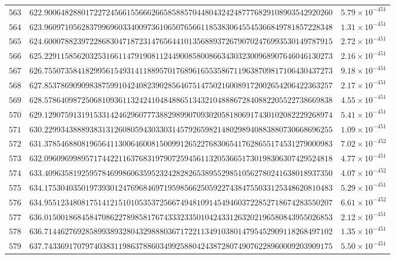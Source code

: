 \documentclass[12pt,reqno]{amsart}
\theoremstyle{remark}
\begin{document}
\begin{longtable}{clc}
$563$ & $622.9006482880172272456615566626658588570448043242487776829108903542920260$ & $5.79\times 10^{-451}$ \\
$564$ & $623.9609710562837996960334009736106507656611853830645545366849781857228348$ & $1.31\times 10^{-451}$ \\
$565$ & $624.6000788239722868304718723147656441013568893726790702476993530149787915$ & $2.72\times 10^{-451}$ \\
$566$ & $625.2291158562032531661147919081124490085800866343032300968907646046130273$ & $2.16\times 10^{-451}$ \\
$567$ & $626.7550735841829956154931411889570176896165535867119638709817106430437273$ & $9.18\times 10^{-451}$ \\
$568$ & $627.8537869090983875991042408239028564675147502160089172002654206422363257$ & $2.17\times 10^{-451}$ \\
$569$ & $628.5786409872506810936113242410484886513432104888672840882205522738669838$ & $4.55\times 10^{-451}$ \\
$570$ & $629.1290759131915331424629607773882989907093020581806917430102082229268974$ & $5.41\times 10^{-451}$ \\
$571$ & $630.2299343888938313126080594303303145792659821480298940883880730668696255$ & $1.09\times 10^{-451}$ \\
$572$ & $631.3785468808196564113006460081500991265227683065417628655174531279000983$ & $7.02\times 10^{-452}$ \\
$573$ & $632.0960969989571744221163768319790725945611320536651730198306307429524818$ & $4.77\times 10^{-451}$ \\
$574$ & $633.4096358192595784699860635952324282826538955298510562780241638018937350$ & $4.07\times 10^{-452}$ \\
$575$ & $634.1753040350197393012476968469719598566250592274384755033125348620810483$ & $5.29\times 10^{-451}$ \\
$576$ & $634.9551234808175141215101053537256674948109145494603722852718674283550207$ & $6.61\times 10^{-452}$ \\
$577$ & $636.0150018684584708622789858176743332335010424331263202196580843955026853$ & $2.12\times 10^{-451}$ \\
$578$ & $636.7144627692858993893280432988803671722113491038014795452909118268497102$ & $1.35\times 10^{-451}$ \\
$579$ & $637.7433691707974038311986378860349925880424387280749076228960009203909175$ & $5.50\times 10^{-451}$ \\

\end{longtable}
\end{document}
